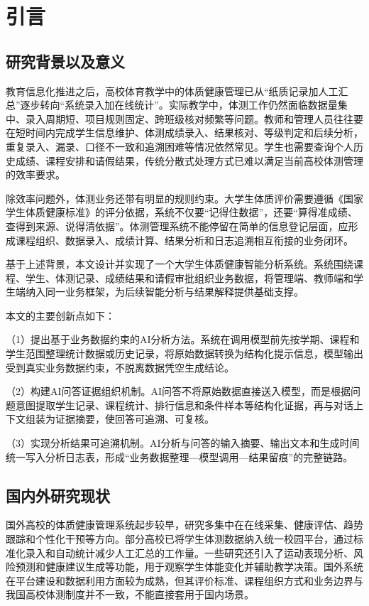 
\chapter{引言}\label{ch:1}

\section{研究背景以及意义}

教育信息化推进之后，高校体育教学中的体质健康管理已从“纸质记录加人工汇总”逐步转向“系统录入加在线统计”。实际教学中，体测工作仍然面临数据量集中、录入周期短、项目规则固定、跨班级核对频繁等问题。教师和管理人员往往要在短时间内完成学生信息维护、体测成绩录入、结果核对、等级判定和后续分析，重复录入、漏录、口径不一致和追溯困难等情况依然常见。学生也需要查询个人历史成绩、课程安排和请假结果，传统分散式处理方式已难以满足当前高校体测管理的效率要求。

除效率问题外，体测业务还带有明显的规则约束。大学生体质评价需要遵循《国家学生体质健康标准》的评分依据\cite{national2014fitness}，系统不仅要“记得住数据”，还要“算得准成绩、查得到来源、说得清依据”。体测管理系统不能停留在简单的信息登记层面，应形成课程组织、数据录入、成绩计算、结果分析和日志追溯相互衔接的业务闭环。

基于上述背景，本文设计并实现了一个大学生体质健康智能分析系统。系统围绕课程、学生、体测记录、成绩结果和请假审批组织业务数据，将管理端、教师端和学生端纳入同一业务框架，为后续智能分析与结果解释提供基础支撑。

本文的主要创新点如下：

（1）提出基于业务数据约束的AI分析方法。系统在调用模型前先按学期、课程和学生范围整理统计数据或历史记录，将原始数据转换为结构化提示信息，模型输出受到真实业务数据约束，不脱离数据凭空生成结论。

（2）构建AI问答证据组织机制。AI问答不将原始数据直接送入模型，而是根据问题意图提取学生记录、课程统计、排行信息和条件样本等结构化证据，再与对话上下文组装为证据摘要，使回答可追溯、可复核。

（3）实现分析结果可追溯机制。AI分析与问答的输入摘要、输出文本和生成时间统一写入分析日志表，形成“业务数据整理—模型调用—结果留痕”的完整链路。

\section{国内外研究现状}

国外高校的体质健康管理系统起步较早，研究多集中在在线采集、健康评估、趋势跟踪和个性化干预等方向。部分高校已将学生体测数据纳入统一校园平台，通过标准化录入和自动统计减少人工汇总的工作量。一些研究还引入了运动表现分析、风险预测和健康建议生成等功能，用于观察学生体能变化并辅助教学决策。国外系统在平台建设和数据利用方面较为成熟，但其评价标准、课程组织方式和业务边界与我国高校体测制度并不一致，不能直接套用于国内场景。

